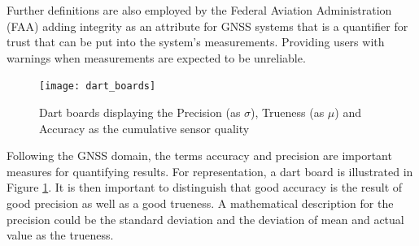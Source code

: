 Further definitions are also employed by the Federal Aviation Administration (FAA) adding integrity as an attribute for GNSS systems that is a quantifier for trust that can be put into the system's measurements. Providing users with warnings when measurements are expected to be unreliable. \cite[B.1.5, B.1.10]{faa_federal_radionavigation_plan_2008}

\begin{figure}[h]
    \centering
    \texttt{[image: dart\_boards]}
    \caption[Data Quality Dartboards]{Dart boards displaying the Precision (as $\sigma$), Trueness (as $\mu$) and Accuracy as the cumulative sensor quality \cite{iso_iso5725-1_accuracy_1997}}
    \label{fig:dart_boards}
\end{figure}

Following the GNSS domain, the terms accuracy and precision are important measures for quantifying results. For representation, a dart board is illustrated in Figure \ref{fig:dart_boards}. It is then important to distinguish that good accuracy is the result of good precision as well as a good trueness. A mathematical description for the precision could be the standard deviation and the deviation of mean and actual value as the trueness. \cite{iso_iso5725-1_accuracy_1997}\cite[S.33ff.]{smith_scientist_1999}




